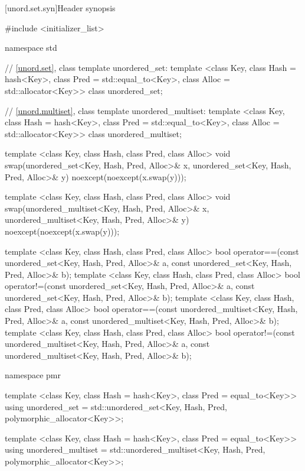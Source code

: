 [unord.set.syn]{Header  synopsis}%
%
%
%
\begin{codeblock}
#include <initializer_list>

namespace std {
  // \ref{unord.set}, class template unordered_set:
  template <class Key,
            class Hash = hash<Key>,
            class Pred = std::equal_to<Key>,
            class Alloc = std::allocator<Key>>
    class unordered_set;

  // \ref{unord.multiset}, class template unordered_multiset:
  template <class Key,
            class Hash = hash<Key>,
            class Pred = std::equal_to<Key>,
            class Alloc = std::allocator<Key>>
    class unordered_multiset;

  template <class Key, class Hash, class Pred, class Alloc>
    void swap(unordered_set<Key, Hash, Pred, Alloc>& x,
              unordered_set<Key, Hash, Pred, Alloc>& y)
      noexcept(noexcept(x.swap(y)));

  template <class Key, class Hash, class Pred, class Alloc>
    void swap(unordered_multiset<Key, Hash, Pred, Alloc>& x,
              unordered_multiset<Key, Hash, Pred, Alloc>& y)
      noexcept(noexcept(x.swap(y)));

  template <class Key, class Hash, class Pred, class Alloc>
    bool operator==(const unordered_set<Key, Hash, Pred, Alloc>& a,
                    const unordered_set<Key, Hash, Pred, Alloc>& b);
  template <class Key, class Hash, class Pred, class Alloc>
    bool operator!=(const unordered_set<Key, Hash, Pred, Alloc>& a,
                    const unordered_set<Key, Hash, Pred, Alloc>& b);
  template <class Key, class Hash, class Pred, class Alloc>
    bool operator==(const unordered_multiset<Key, Hash, Pred, Alloc>& a,
                    const unordered_multiset<Key, Hash, Pred, Alloc>& b);
  template <class Key, class Hash, class Pred, class Alloc>
    bool operator!=(const unordered_multiset<Key, Hash, Pred, Alloc>& a,
                    const unordered_multiset<Key, Hash, Pred, Alloc>& b);

  namespace pmr {
    template <class Key,
              class Hash = hash<Key>,
              class Pred = equal_to<Key>>
      using unordered_set = std::unordered_set<Key, Hash, Pred,
                                               polymorphic_allocator<Key>>;

    template <class Key,
              class Hash = hash<Key>,
              class Pred = equal_to<Key>>
      using unordered_multiset = std::unordered_multiset<Key, Hash, Pred,
                                                         polymorphic_allocator<Key>>;
  }
}
\end{codeblock}

